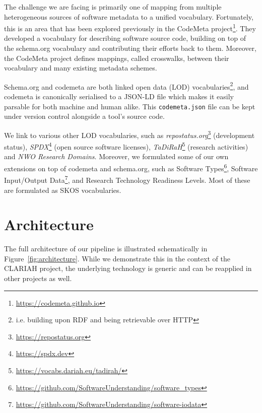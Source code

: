 \documentclass[a4paper,11pt]{article}
\begin{document}
The challenge we are facing is primarily one of mapping from multiple
heterogeneous sources of software metadata to a unified vocabulary.
Fortunately, this is an area that has been explored previously in the CodeMeta
project\footnote{\url{https://codemeta.github.io}}. They developed a
vocabulary for describing software source code, building on top of the
schema.org vocabulary and contributing their efforts back to them. Moreover,
the CodeMeta project defines mappings, called crosswalks, between their
vocabulary and many existing metadata schemes. 

Schema.org and codemeta are both linked open data (LOD) vocabularies\footnote{i.e.
building upon RDF and being retrievable over HTTP}, and codemeta is canonically
serialised to a JSON-LD file which makes it easily parsable for both machine
and human alike. This \texttt{codemeta.json} file can be kept under version
control alongside a tool's source code. 

We link to various other LOD vocabularies, such as
\emph{repostatus.org}\footnote{\url{https://repostatus.org}} (development
status), \emph{SPDX}\footnote{\url{https://spdx.dev}} (open source software
licenses), \emph{TaDiRaH}\footnote{\url{https://vocabs.dariah.eu/tadirah/}}
(research activities) \citep{TADIRAH} and \emph{NWO Research Domains}.
Moreover, we formulated some of our own extensions on top of codemeta and
schema.org, such as Software
Types\footnote{\url{https://github.com/SoftwareUnderstanding/software_types}},
Software Input/Output
Data\footnote{\url{https://github.com/SoftwareUnderstanding/software-iodata}},
and Research Technology Readiness Levels. Most of these are formulated as SKOS
vocabularies.

\section{Architecture}

The full architecture of our pipeline is illustrated schematically in
Figure~\ref{fig:architecture}. While we demonstrate this in the context of the
CLARIAH project, the underlying technology is generic and can be reapplied in
other projects as well.
\end{document}
